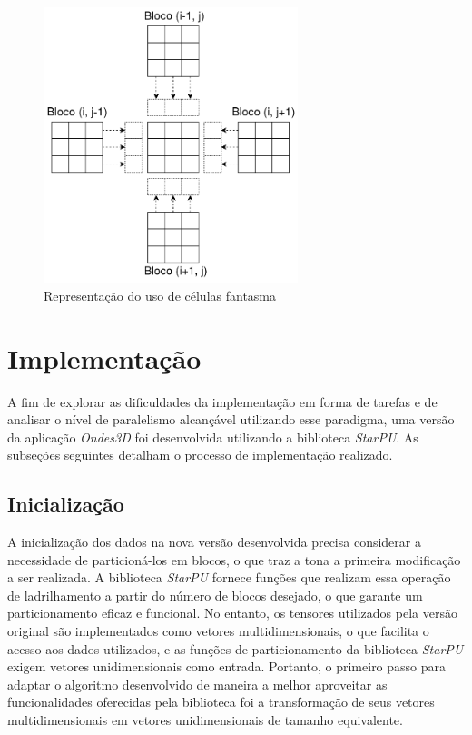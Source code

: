 \documentclass[cic,tc]{iiufrgs}
\begin{document}
\begin{figure}[!htb]
    \caption{Representação do uso de células fantasma}
    \begin{center}
      \includegraphics[width=20em]{ghost_cells}
    \end{center}
    \label{fig:ghost_cells}
\end{figure}

\section{Implementação}

A fim de explorar as dificuldades da implementação em forma de tarefas e de analisar o nível de paralelismo alcançável utilizando esse paradigma, uma versão da aplicação \textit{Ondes3D} foi
desenvolvida utilizando a biblioteca \textit{StarPU}. As subseções seguintes detalham o processo de implementação realizado.

\subsection{Inicialização}

A inicialização dos dados na nova versão desenvolvida precisa considerar a necessidade de particioná-los em blocos, o que traz a tona a primeira modificação a ser realizada. A biblioteca
\textit{StarPU} fornece funções que realizam essa operação de ladrilhamento a partir do número de blocos desejado, o que garante um particionamento eficaz e funcional. No entanto, os tensores
utilizados pela versão original são implementados como vetores multidimensionais, o que facilita o acesso aos dados utilizados, e as funções de particionamento da biblioteca \textit{StarPU} exigem
vetores unidimensionais como entrada. Portanto, o primeiro passo para adaptar o algoritmo desenvolvido de maneira a melhor aproveitar as funcionalidades oferecidas pela biblioteca foi a transformação 
de seus vetores multidimensionais em vetores unidimensionais de tamanho equivalente.
\end{document}
